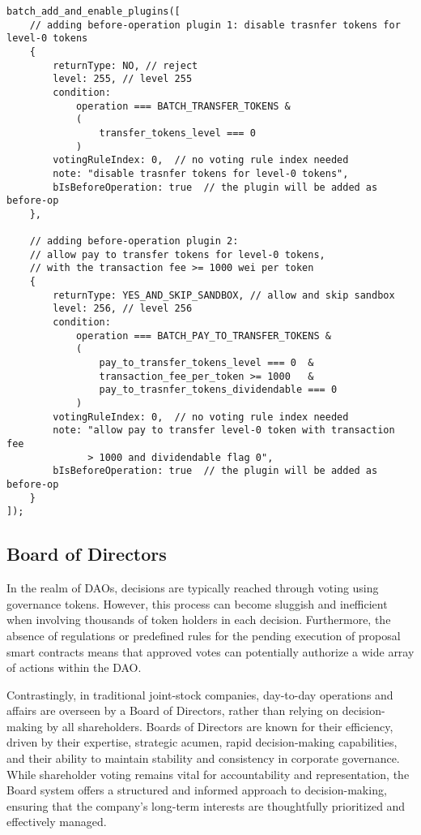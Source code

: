 \documentclass[main.tex]{subfiles}
\begin{document}
\begin{verbatim}
batch_add_and_enable_plugins([
    // adding before-operation plugin 1: disable trasnfer tokens for level-0 tokens
    {
        returnType: NO, // reject
        level: 255, // level 255
        condition:
            operation === BATCH_TRANSFER_TOKENS & 
            ( 
                transfer_tokens_level === 0
            )
        votingRuleIndex: 0,  // no voting rule index needed
        note: "disable trasnfer tokens for level-0 tokens",
        bIsBeforeOperation: true  // the plugin will be added as before-op
    },

    // adding before-operation plugin 2: 
    // allow pay to transfer tokens for level-0 tokens, 
    // with the transaction fee >= 1000 wei per token
    {
        returnType: YES_AND_SKIP_SANDBOX, // allow and skip sandbox
        level: 256, // level 256
        condition:
            operation === BATCH_PAY_TO_TRANSFER_TOKENS & 
            ( 
                pay_to_transfer_tokens_level === 0  &
                transaction_fee_per_token >= 1000   &
                pay_to_trasnfer_tokens_dividendable === 0
            )
        votingRuleIndex: 0,  // no voting rule index needed
        note: "allow pay to transfer level-0 token with transaction fee 
              > 1000 and dividendable flag 0",
        bIsBeforeOperation: true  // the plugin will be added as before-op
    }
]);
\end{verbatim}

\subsection{Board of Directors}

In the realm of DAOs, decisions are typically reached through voting using governance tokens. However, this process can become sluggish and inefficient when involving thousands of token holders in each decision. Furthermore, the absence of regulations or predefined rules for the pending execution of proposal smart contracts means that approved votes can potentially authorize a wide array of actions within the DAO.

Contrastingly, in traditional joint-stock companies, day-to-day operations and affairs are overseen by a Board of Directors, rather than relying on decision-making by all shareholders. Boards of Directors are known for their efficiency, driven by their expertise, strategic acumen, rapid decision-making capabilities, and their ability to maintain stability and consistency in corporate governance. While shareholder voting remains vital for accountability and representation, the Board system offers a structured and informed approach to decision-making, ensuring that the company's long-term interests are thoughtfully prioritized and effectively managed.
\end{document}
